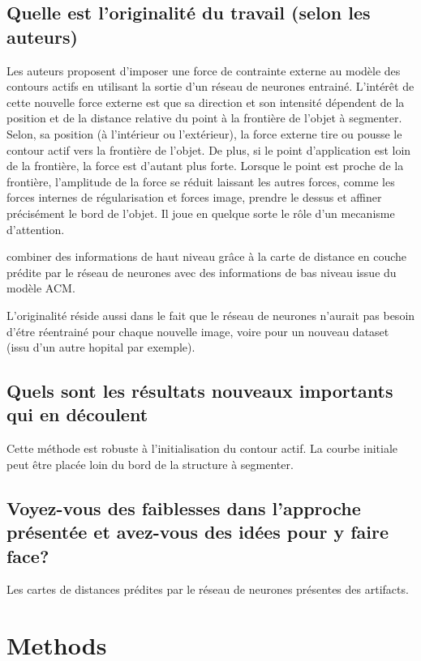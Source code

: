 \documentclass[a4paper, 11pt]{article}
\begin{document}
\subsection{Quelle est l'originalité du travail (selon les auteurs)}

Les auteurs proposent d'imposer une force de contrainte externe au modèle des contours actifs en utilisant la sortie d'un réseau de neurones entrainé. L'intérêt de cette nouvelle force externe est que sa direction et son intensité dépendent de la position et de la distance relative du point à la frontière de l'objet à segmenter. Selon, sa position (à l'intérieur ou l'extérieur), la force externe tire ou pousse le contour actif vers la frontière de l'objet. De plus, si le point d'application est loin de la frontière, la force est d'autant plus forte. Lorsque le point est proche de la frontière, l'amplitude de la force se réduit laissant les autres forces, comme les forces internes de régularisation et forces image, prendre le dessus et affiner précisément le bord de l'objet. Il joue en quelque sorte le rôle d'un mecanisme d'attention.

combiner des informations de haut niveau grâce à la carte de distance en couche prédite par le réseau de neurones avec des informations de bas niveau issue du modèle ACM. 

L'originalité réside aussi dans le fait que le réseau de neurones n'aurait pas besoin d'étre réentrainé pour chaque nouvelle image, voire pour un nouveau dataset (issu d'un autre hopital par exemple). 

\subsection{Quels sont les résultats nouveaux importants qui en découlent}

Cette méthode est robuste à l'initialisation du contour actif. La courbe initiale peut être placée loin du bord de la structure à segmenter. 

\subsection{Voyez-vous des faiblesses dans l'approche présentée et avez-vous des idées pour y faire face?}

Les cartes de distances prédites par le réseau de neurones présentes des artifacts. 


\section{Methods}
\end{document}
